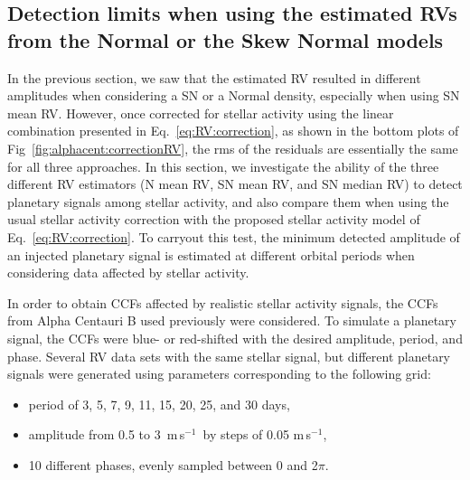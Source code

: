 \documentclass{aa}
\def\ms{\hbox{\,m\,s$^{-1}$}}         %
\begin{document}
\subsection{Detection limits when using the estimated RVs from the Normal or the Skew Normal models} \label{sec:detect_limits}

In the previous section, we saw that the estimated RV resulted in different amplitudes when considering a SN or a Normal density, especially when using SN mean RV. 
However, once corrected for stellar activity using the linear combination presented in Eq.~\eqref{eq:RV:correction}, as shown in the bottom plots of Fig~\ref{fig:alphacent:correctionRV}, the rms of the residuals are essentially the same for all three approaches.
In this section, we investigate the ability of the three different RV estimators (N mean RV, SN mean RV, and SN median RV) to detect planetary signals among stellar activity, and also compare them when using the usual stellar activity correction with the proposed stellar activity model of Eq.~\eqref{eq:RV:correction}.
To carryout this test, the minimum detected amplitude of an injected planetary signal is estimated at different orbital periods when considering data affected by stellar activity.

In order to obtain CCFs affected by realistic stellar activity signals, the CCFs from Alpha Centauri B used previously were considered. 
To simulate a planetary signal, the CCFs were blue- or red-shifted with the desired amplitude, period, and phase.
Several RV data sets with the same stellar signal, but different planetary signals were generated using parameters corresponding to the following grid:
\begin{itemize}
\item period of 3, 5, 7, 9, 11, 15, 20, 25, and 30 days,
\item amplitude from 0.5 to 3 \ms\, by steps of 0.05\,\ms,
\item 10 different phases, evenly sampled between 0 and 2$\pi$.
\end{itemize}
\end{document}

